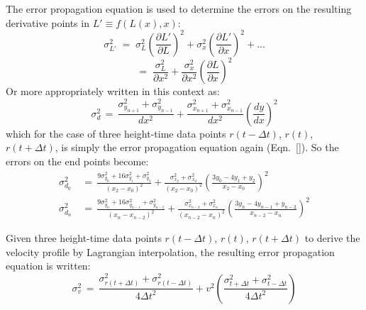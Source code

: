 \documentclass[namedreferences]{SolarPhysics}
\begin{document}
\begin{article}
The error propagation equation is used to determine the errors on the resulting derivative points in $L' \equiv f(L(x),x)$:
\begin{equation}
\sigma_{L'}^2 \; = \; \sigma_L^2 \left(\frac{\partial L'}{\partial L}\right)^2 + \sigma_x^2\left(\frac{\partial L'}{\partial x}\right)^2+...
\end{equation}
\begin{equation}
=\; \frac{\sigma_L^2}{\partial x^2}+\frac{\sigma_x^2}{\partial x^2}\left(\frac{\partial L}{\partial x}\right)^2
\end{equation}
Or more appropriately written in this context as:
\begin{equation}
\sigma_d^2 \,=\, \frac{\sigma_{y_{n+1}}^2+\sigma_{y_{n-1}}^2}{dx^2} + \frac{\sigma_{x_{n+1}}^2+\sigma_{x_{n-1}}^2}{dx^2}\left(\frac{dy}{dx}\right)^2
\end{equation}
which for the case of three height-time data points $r(t-\Delta t)$, $r(t)$, $r(t+\Delta t)$, is simply the error propagation equation again (Eqn.~\ref{}).
So the errors on the end points become:
\begin{eqnarray}
\sigma_{d_0}^2 \,&=\, \frac{9\sigma_{y_0}^2+16\sigma_{y_1}^2+\sigma_{y_2}^2}{\left(x_2-x_0\right)^2} + \frac{\sigma_{x_2}^2+\sigma_{x_0}^2}{\left(x_2-x_0\right)^2} \left( \frac{3y_0-4y_1+y_2}{x_2-x_0}\right)^2 \\
\sigma_{d_n}^2 \,&=\, \frac{9\sigma_{y_n}^2+16\sigma_{y_{n-1}}^2+\sigma_{y_{n-2}}^2}{\left(x_n-x_{n-2}\right)^2} + \frac{\sigma_{x_{n-2}}^2+\sigma_{x_n}^2}{\left(x_{n-2}-x_n\right)^2} \left( \frac{3y_n-4y_{n-1}+y_{n-2}}{x_{n-2}-x_n}\right)^2
\end{eqnarray}

Given three height-time data points $r(t-\Delta t)$, $r(t)$, $r(t+\Delta t)$ to derive the velocity profile by Lagrangian interpolation, the resulting error propagation equation is written:
\begin{equation}
\sigma_v^2 \,=\, \frac{\sigma_{r(t+\Delta t)}^2+\sigma_{r(t-\Delta t)}^2}{4\Delta t^2} + v^2 \left( \frac{\sigma_{t+\Delta t}^2+\sigma_{t-\Delta t}^2}{4\Delta t^2} \right)
\end{equation}



\end{article}
\end{document}
